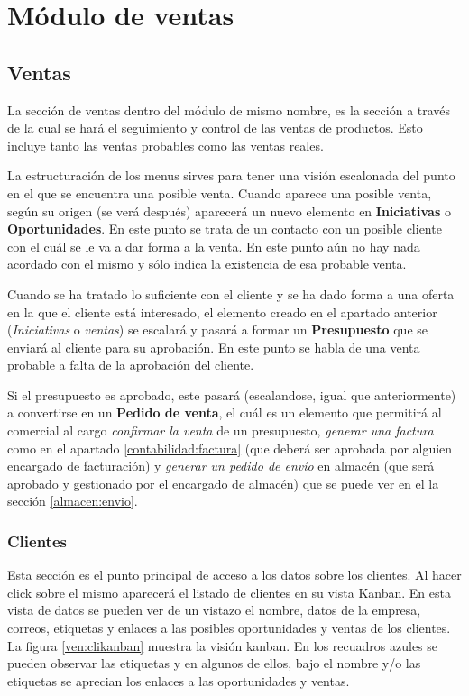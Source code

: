 \chapter{Módulo de ventas}



\section{Ventas}

La sección de ventas dentro del módulo de mismo nombre, es la sección a través de la 
cual se hará el seguimiento y control de las ventas de productos. Esto incluye tanto
las ventas probables como las ventas reales.

La estructuración de los menus sirves para tener una visión escalonada del punto en el que
se encuentra una posible venta. Cuando aparece una posible venta, según su origen (se verá
después) aparecerá un nuevo elemento en \textbf{Iniciativas} o \textbf{Oportunidades}. En
este punto se trata de un contacto con un posible cliente con el cuál se le va a dar forma a
la venta. En este punto aún no hay nada acordado con el mismo y sólo indica la existencia
de esa probable venta.

Cuando se ha tratado lo suficiente con el cliente y se ha dado forma a una oferta en la que el
cliente está interesado, el elemento creado en el apartado anterior (\emph{Iniciativas} o
\emph{ventas}) se escalará y pasará a formar un \textbf{Presupuesto} que se enviará al cliente
para su aprobación. En este punto se habla de una venta probable a falta de la aprobación del
cliente.

Si el presupuesto es aprobado, este pasará (escalandose, igual que anteriormente) a convertirse
en un \textbf{Pedido de venta}, el cuál es un elemento que permitirá al comercial al cargo
\emph{confirmar la venta} de un presupuesto, \emph{generar una factura} como en el apartado
\ref{contabilidad:factura} (que deberá ser aprobada por alguien
encargado de facturación) y \emph{generar un pedido de envío} en almacén (que será aprobado y
 gestionado por el encargado de almacén) que se puede ver en el la sección \ref{almacen:envio}.


\subsection{Clientes}
\label{ven:clientes}
Esta sección es el punto principal de acceso a los datos sobre los clientes. Al hacer click
sobre el mismo aparecerá el listado de clientes en su vista Kanban. En esta vista de datos
se pueden ver de un vistazo el nombre, datos de la empresa, correos, etiquetas y 
enlaces a las posibles oportunidades y ventas de los clientes. La figura \ref{ven:clikanban}
muestra la visión kanban. En los recuadros azules se pueden observar las etiquetas
y en algunos de ellos, bajo el nombre y/o las etiquetas se aprecian los enlaces a 
las oportunidades y ventas.


